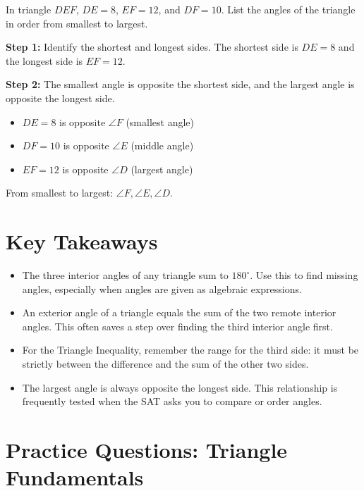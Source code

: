 \documentclass[14pt]{extarticle}
\begin{document}
In triangle \(DEF\), \(DE = 8\), \(EF = 12\), and \(DF = 10\). List the angles of the triangle in order from smallest to largest.

\textbf{Step 1:} Identify the shortest and longest sides.
The shortest side is \(DE = 8\) and the longest side is \(EF = 12\).

\textbf{Step 2:} The smallest angle is opposite the shortest side, and the largest angle is opposite the longest side.
\begin{itemize}
  \item \(DE = 8\) is opposite \(\angle F\) (smallest angle)
  \item \(DF = 10\) is opposite \(\angle E\) (middle angle)
  \item \(EF = 12\) is opposite \(\angle D\) (largest angle)
\end{itemize}

From smallest to largest: \(\boxed{\angle F, \angle E, \angle D}\).

\section*{Key Takeaways}
\begin{itemize}
  \item The three interior angles of any triangle sum to \(180^\circ\). Use this to find missing angles, especially when angles are given as algebraic expressions.
  \item An exterior angle of a triangle equals the sum of the two remote interior angles. This often saves a step over finding the third interior angle first.
  \item For the Triangle Inequality, remember the range for the third side: it must be strictly between the difference and the sum of the other two sides.
  \item The largest angle is always opposite the longest side. This relationship is frequently tested when the SAT asks you to compare or order angles.
\end{itemize}

\newpage

\section*{Practice Questions: Triangle Fundamentals}
\end{document}
